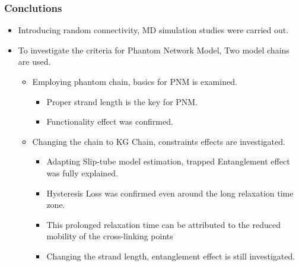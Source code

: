 \documentclass[12pt, dvipdfmx]{beamer}
\begin{document}
\begin{frame}
	\frametitle{Conclutions}

	\begin{itemize}
		\item Introducing random connectivity, MD simulation studies were carried out.
		\item To investigate the criteria for Phantom Network Model, Two model chains are used.
		\begin{itemize}
			\item Employing phantom chain, basics for PNM is examined.
			\begin{itemize}
				\item Proper strand length is the key for PNM.
				\item Functionality effect was confirmed.
			\end{itemize}
			\item Changing the chain to KG Chain, constraints effects are investigated.
			\begin{itemize}
				\item Adapting Slip-tube model estimation, trapped Entanglement effect was fully explained.
				\item Hysteresis Loss was confirmed even around the long relaxation time zone.
				\item This prolonged relaxation time can be attributed to the reduced mobility of the cross-linking points
				\item Changing the strand length, entanglement effect is still investigated.
			\end{itemize}
		\end{itemize}
	\end{itemize}


\end{frame}
\end{document}

